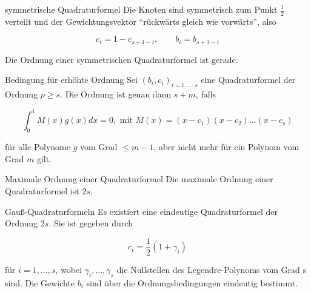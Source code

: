 \begin{flashcard}[Definition]{symmetrische Quadraturformel}
	Die Knoten sind symmetrisch zum Punkt $\frac{1}{2}$ verteilt und der Gewichtungsvektor "`rückwärts gleich wie vorwärts"', also

$$ c_i = 1 - c_{s+1-i},\qquad b_i = b_{s + 1 - i}$$

Die Ordnung einer symmetrischen Quadraturformel ist gerade.
\end{flashcard}

\begin{flashcard}[Satz]{Bedingung für erhöhte Ordnung}
	Sei $(b_i, c_i)_{i=1,\ldots,s}$ eine Quadraturformel der Ordnung $p \geq s$. Die Ordnung ist genau dann $s + m$, falls

	$$ \int_0^1 M(x) g(x) dx = 0, \text{ mit } M(x) = (x-c_1)(x-c_2) \dots (x-c_s)$$

	für alle Polynome $g$ vom Grad $\leq m - 1$, aber nicht mehr für ein Polynom vom Grad $m$ gilt.
\end{flashcard}

\begin{flashcard}[Satz]{Maximale Ordnung einer Quadraturformel}
	Die maximale Ordnung einer Quadraturformel ist $2s$.
\end{flashcard}

\begin{flashcard}[Satz]{Gauß-Quadraturformeln}
	Es existiert eine eindeutige Quadraturformel der Ordnung $2s$. Sie ist gegeben durch

	$$ c_i = \frac{1}{2}(1 + \gamma_i) $$

	für $i = 1,\ldots,s$, wobei $\gamma_i,\ldots,\gamma_s$ die Nullstellen des Legendre-Polynoms vom Grad s sind.
	Die Gewichte $b_i$ sind über die Ordnungsbedingungen eindeutig bestimmt.
\end{flashcard}
